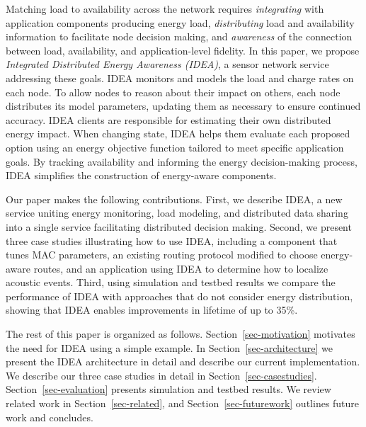 Matching load to availability across the network requires
\textit{integrating} with application components producing energy load,
\textit{distributing} load and availability information to facilitate node
decision making, and \textit{awareness} of the connection between load,
availability, and application-level fidelity. In this paper, we propose
\textit{Integrated Distributed Energy Awareness (IDEA)}, a sensor network
service addressing these goals. IDEA monitors and models the load and charge
rates on each node. To allow nodes to reason about their impact on others,
each node distributes its model parameters, updating them as necessary to
ensure continued accuracy. IDEA clients are responsible for estimating their
own distributed energy impact. When changing state, IDEA helps them evaluate
each proposed option using an energy objective function tailored to meet
specific application goals. By tracking availability and informing the energy
decision-making process, IDEA simplifies the construction of energy-aware
components.

Our paper makes the following contributions. First, we describe IDEA, a new
service uniting energy monitoring, load modeling, and distributed data
sharing into a single service facilitating distributed decision making.
Second, we present three case studies illustrating how to use IDEA, including
a component that tunes MAC parameters, an existing routing protocol modified
to choose energy-aware routes, and an application using IDEA to determine how
to localize acoustic events. Third, using simulation and testbed results we
compare the performance of IDEA with approaches that do not consider energy
distribution, showing that IDEA enables improvements in lifetime of up to
35\%.

The rest of this paper is organized as follows. Section~\ref{sec-motivation}
motivates the need for IDEA using a simple example. In
Section~\ref{sec-architecture} we present the IDEA architecture in detail and
describe our current implementation. We describe our three case studies in
detail in Section~\ref{sec-casestudies}. Section~\ref{sec-evaluation}
presents simulation and testbed results. We review related work in
Section~\ref{sec-related}, and Section~\ref{sec-futurework} outlines future
work and concludes.

